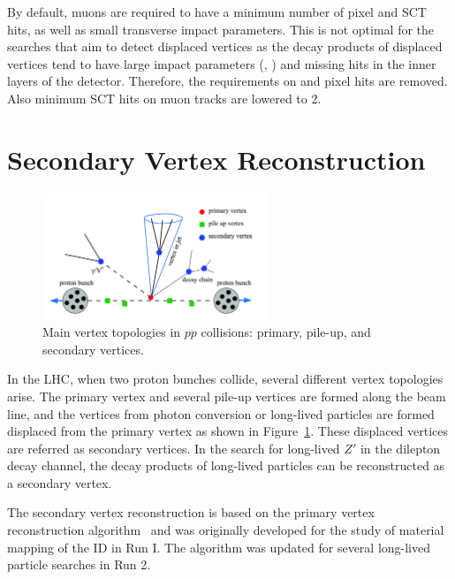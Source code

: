By default, muons are required to have a minimum number of pixel and SCT hits, as well as small transverse impact parameters. This is not optimal for the searches that aim to detect displaced vertices as the decay products of displaced vertices tend to have large impact parameters (\dzero, \zzero) and missing hits in the inner layers of the detector. Therefore, the requirements on \dzero and pixel hits are removed. Also minimum SCT hits on muon tracks are lowered to 2.

\section{Secondary Vertex Reconstruction}
\label{sec:reco:dv}

\begin{figure}[!htb]
    \includegraphics[width=0.6\textwidth]{figures/vertex.png}
    \centering
    \caption{Main vertex topologies in $pp$ collisions: primary, pile-up, and secondary vertices.}
    \label{fig:vertex_topology}
\end{figure}

In the LHC, when two proton bunches collide, several different vertex topologies arise. The primary vertex and several pile-up vertices are formed along the beam line, and the vertices from photon conversion or long-lived particles are formed displaced from the primary vertex as shown in Figure~\ref{fig:vertex_topology}. These displaced vertices are referred as secondary vertices. In the search for long-lived $Z'$ in the dilepton decay channel, the decay products of long-lived particles can be reconstructed as a secondary vertex.

The secondary vertex reconstruction is based on the primary vertex reconstruction algorithm~\cite{1742-6596-119-3-032033} and was originally developed for the study of material mapping of the ID in Run I. The algorithm was updated for several long-lived particle searches in Run 2.

